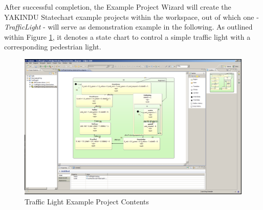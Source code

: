 After successful completion, the Example Project Wizard will create the YAKINDU
Statechart example projects within the workspace, out of which one -
\emph{TrafficLight} - will serve as demonstration example in the following. As
outlined within Figure \ref{fig:screenshot3}, it denotes a state chart to control
a simple traffic light with a corresponding pedestrian light.

\begin{figure}[h!]
\center
\includegraphics[width=\textwidth]{./Pictures/Screenshot3}
\caption{\label{fig:screenshot3} Traffic Light Example Project Contents}
\end{figure}

\clearpage